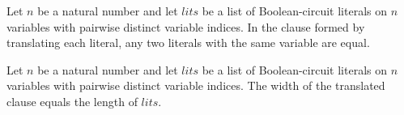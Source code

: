 \begin{theorem}
\label{BoolCircuit.NOrCircuit.clauseToClause_var_inj}
\leanok
{}
Let $n$ be a natural number and let $lits$ be a list of Boolean-circuit literals on $n$
variables with pairwise distinct variable indices. In the clause formed by translating
each literal, any two literals with the same variable are equal.
\end{theorem}

\begin{theorem}
\label{BoolCircuit.NOrCircuit.clauseToClause_width}
\leanok
{}
Let $n$ be a natural number and let $lits$ be a list of Boolean-circuit literals on $n$
variables with pairwise distinct variable indices. The width of the translated clause
equals the length of $lits$.
\end{theorem}
